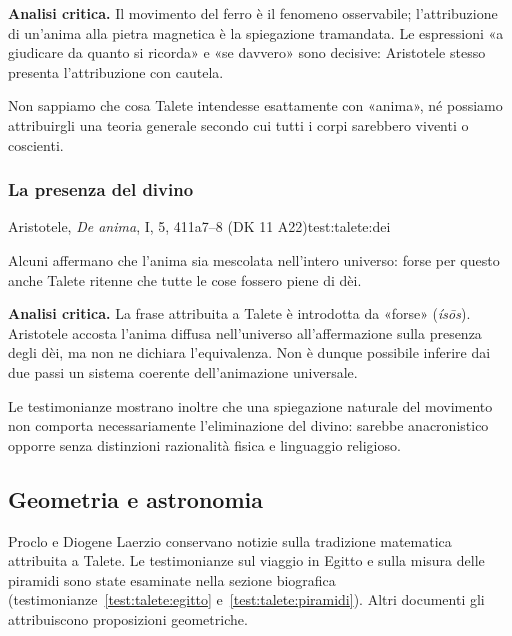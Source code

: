 \noindent\textbf{Analisi critica.}
Il movimento del ferro è il fenomeno osservabile; l'attribuzione di un'anima alla pietra magnetica è la spiegazione tramandata. Le espressioni «a giudicare da quanto si ricorda» e «se davvero» sono decisive: Aristotele stesso presenta l'attribuzione con cautela.

Non sappiamo che cosa Talete intendesse esattamente con «anima», né possiamo attribuirgli una teoria generale secondo cui tutti i corpi sarebbero viventi o coscienti.

\subsubsection{La presenza del divino}

\begin{testimonianza}{Aristotele, \emph{De anima}, I, 5, 411a7--8 (DK 11 A22)}{test:talete:dei}
\smallskip
{}\par
Alcuni affermano che l'anima sia mescolata nell'intero universo: forse per questo anche Talete ritenne che tutte le cose fossero piene di dèi.
\end{testimonianza}


\noindent\textbf{Analisi critica.}
La frase attribuita a Talete è introdotta da «forse» (\emph{ísōs}). Aristotele accosta l'anima diffusa nell'universo all'affermazione sulla presenza degli dèi, ma non ne dichiara l'equivalenza. Non è dunque possibile inferire dai due passi un sistema coerente dell'animazione universale.

Le testimonianze mostrano inoltre che una spiegazione naturale del movimento non comporta necessariamente l'eliminazione del divino: sarebbe anacronistico opporre senza distinzioni razionalità fisica e linguaggio religioso.

\subsection{Geometria e astronomia}

Proclo e Diogene Laerzio conservano notizie sulla tradizione matematica attribuita a Talete. Le testimonianze sul viaggio in Egitto e sulla misura delle piramidi sono state esaminate nella sezione biografica (testimonianze~\ref{test:talete:egitto} e~\ref{test:talete:piramidi}). Altri documenti gli attribuiscono proposizioni geometriche.


